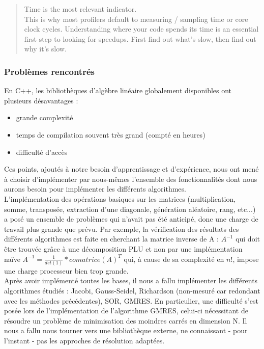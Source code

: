 \begin{quote}
	Time is the most relevant indicator.\\
	This is why most profilers default to measuring / sampling time or core clock cycles. Understanding where your code spends its time is an essential first step to looking for speedups. First find out what's slow, then find out why it's slow.
\end{quote}


\subsubsection{Problèmes rencontrés}
En C++, les bibliothèques d'algèbre linéaire globalement disponibles ont plusieurs désavantages :
\begin{itemize}
	\item grande complexité
	\item temps de compilation souvent très grand (compté en heures)
	\item difficulté d'accès
\end{itemize}

Ces points, ajoutés à notre besoin d'apprentissage et d'expérience, nous ont mené à choisir d'implémenter par nous-mêmes l'ensemble des fonctionnalités dont nous aurons besoin pour implémenter les différents algorithmes.\\

L'implémentation des opérations basiques sur les matrices (multiplication, somme, transposée, extraction d'une diagonale, génération aléatoire, rang, etc...) a posé un ensemble de problèmes qui n'avait pas été anticipé, donc une charge de travail plus grande que prévu. Par exemple, la vérification des résultats des différents algorithmes est faite en cherchant la matrice inverse de A : $A^{-1}$ qui doit être trouvée grâce à une décomposition PLU et non par une implémentation naïve $A^{-1} = \frac{1}{det(1)} * comatrice(A)^{T}$ qui, à cause de sa complexité en $n!$, impose une charge processeur bien trop grande. \\

Après avoir implémenté toutes les bases, il nous a fallu implémenter les différents algorithmes étudiés : Jacobi, Gauss-Seidel, Richardson (non-mesuré car redondant avec les méthodes précédentes), SOR, GMRES. En particulier, une difficulté s'est posée lors de l'implémentation de l'algorithme GMRES, celui-ci nécessitant de résoudre un problème de minimisation des moindres carrés en dimension N. Il nous a fallu nous tourner vers une bibliothèque externe, ne connaissant - pour l'instant - pas les approches de résolution adaptées.

